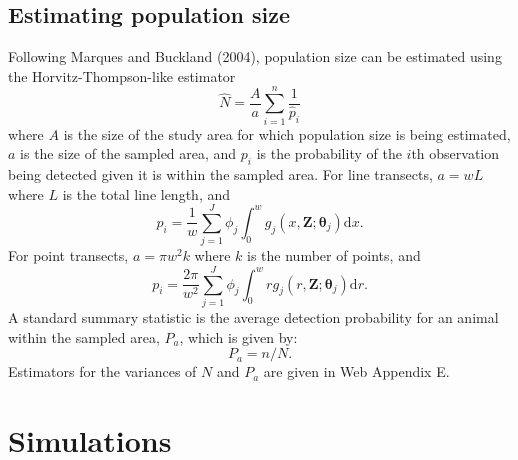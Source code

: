 \documentclass[useAMS,referee]{biom}
\begin{document}
\subsection{Estimating population size}
\label{s:popsize}

Following Marques and Buckland (2004), population size can be estimated using the Horvitz-Thompson-like estimator
\begin{equation}
\label{e:popsize}
\hat{N}=\frac{A}{a}\sum_{i=1}^n \frac{1}{\hat {p}_i}
\end{equation}
where $A$ is the size of the study area for which population size is being estimated, $a$ is the size of the sampled area, and $p_i$ is the probability of the $i\text{th}$ observation being detected given it is within the sampled area.  For line transects, $a=wL$ where $L$ is the total line length, and 
\begin{equation*}
p_i = \frac{1}{w} \sum_{j=1}^J \phi_j \int_0^w  g_j(x,\mathbf{Z}; \bm{\theta}_j) \text{d}x.
\end{equation*}
For point transects, $a=\pi w^2 k$ where $k$ is the number of points, and 
\begin{equation*}
p_i = \frac{2\pi}{w^2} \sum_{j=1}^J \phi_j \int_0^w  r g_j(r,\mathbf{Z}; \bm{\theta}_j) \text{d}r.
\end{equation*}
A standard summary statistic is the average detection probability for an animal within the sampled area, $P_a$, which is given by:
\begin{equation*}
P_a = n/N.
\end{equation*}
Estimators for the variances of $N$ and $P_a$ are given in Web Appendix E.


\section{Simulations}
\label{s:sims}
\end{document}
